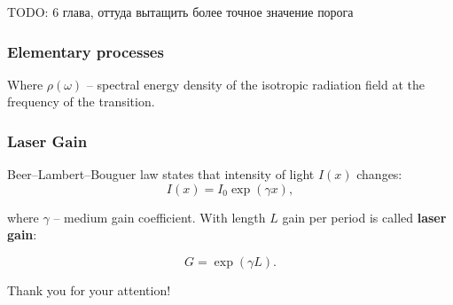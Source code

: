 \documentclass{beamer}
\begin{document}
	\begin{frame}
		TODO: 6 глава, оттуда вытащить более точное значение порога
	\end{frame}
	
	
	
	
	\begin{frame}
		\frametitle{Elementary processes}
		
%			
%
%		
		
		\vspace{10pt}
		\footnotesize
		Where $\rho(\omega)$ -- spectral energy density of the isotropic radiation field at the frequency of the transition.
	\end{frame}

	\begin{frame}
	\frametitle{Laser Gain}
	
	Beer–Lambert–Bouguer law states that intensity of light $I(x)$ changes:
	$$I(x) = I_0 \exp({\gamma x}),$$
	
	where $\gamma$ -- medium gain coefficient. With length $L$ gain per period is called \textbf{laser gain}:
	
	$$G = \exp{(\gamma L)}.$$
	\end{frame}
	
	\begin{frame}[plain,c]
		
		\begin{center}
			\huge {} Thank you for your attention!
		\end{center}
		
	\end{frame}
	
\end{document}
